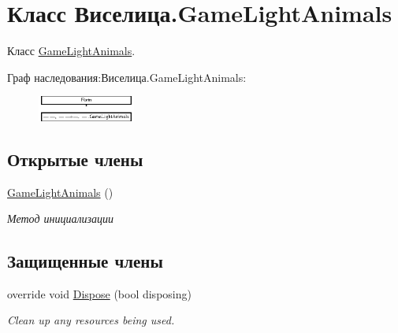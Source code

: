 \hypertarget{class_xD0_x92_xD0_xB8_xD1_x81_xD0_xB5_xD0_xBB_xD0_xB8_xD1_x86_xD0_xB0_1_1_game_light_animals}{\section{Класс Виселица.\+Game\+Light\+Animals}
\label{class_xD0_x92_xD0_xB8_xD1_x81_xD0_xB5_xD0_xBB_xD0_xB8_xD1_x86_xD0_xB0_1_1_game_light_animals}
}


Класс \hyperlink{class_xD0_x92_xD0_xB8_xD1_x81_xD0_xB5_xD0_xBB_xD0_xB8_xD1_x86_xD0_xB0_1_1_game_light_animals}{Game\+Light\+Animals}.  


Граф наследования\+:Виселица.\+Game\+Light\+Animals\+:\begin{figure}[H]
\begin{center}
\leavevmode
\includegraphics[height=0.830860cm]{class_xD0_x92_xD0_xB8_xD1_x81_xD0_xB5_xD0_xBB_xD0_xB8_xD1_x86_xD0_xB0_1_1_game_light_animals}
\end{center}
\end{figure}
\subsection*{Открытые члены}
\begin{DoxyCompactItemize}
\item 
\hyperlink{class_xD0_x92_xD0_xB8_xD1_x81_xD0_xB5_xD0_xBB_xD0_xB8_xD1_x86_xD0_xB0_1_1_game_light_animals_a1a99aefd2bbf2efaf512a19b501b8595}{Game\+Light\+Animals} ()
\begin{DoxyCompactList}\small\item\em Метод инициализации \end{DoxyCompactList}\end{DoxyCompactItemize}
\subsection*{Защищенные члены}
\begin{DoxyCompactItemize}
\item 
override void \hyperlink{class_xD0_x92_xD0_xB8_xD1_x81_xD0_xB5_xD0_xBB_xD0_xB8_xD1_x86_xD0_xB0_1_1_game_light_animals_a4dcd587a0ab653b506713254151d3abb}{Dispose} (bool disposing)
\begin{DoxyCompactList}\small\item\em Clean up any resources being used. \end{DoxyCompactList}\end{DoxyCompactItemize}


